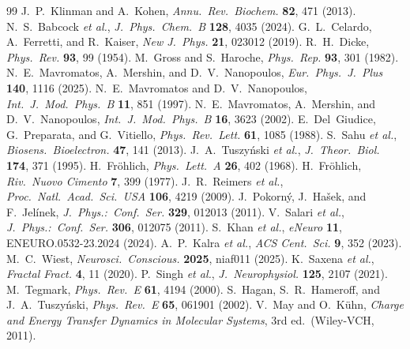 \documentclass[twocolumn,10pt]{article}
\begin{document}
\begin{thebibliography}{99}
 J.~P.~Klinman and A.~Kohen,
\textit{Annu.\ Rev.\ Biochem.} \textbf{82}, 471 (2013).
 N.~S.~Babcock \textit{et al.},
\textit{J.\ Phys.\ Chem.\ B} \textbf{128}, 4035 (2024).
 G.~L.~Celardo, A.~Ferretti, and R.~Kaiser,
\textit{New J.\ Phys.} \textbf{21}, 023012 (2019).
 R.~H.~Dicke,
\textit{Phys.\ Rev.} \textbf{93}, 99 (1954).
 M.~Gross and S.~Haroche,
\textit{Phys.\ Rep.} \textbf{93}, 301 (1982).
 N.~E.~Mavromatos, A.~Mershin, and D.~V.~Nanopoulos,
\textit{Eur.\ Phys.\ J.\ Plus} \textbf{140}, 1116 (2025).
 N.~E.~Mavromatos and D.~V.~Nanopoulos,
\textit{Int.\ J.\ Mod.\ Phys.\ B} \textbf{11}, 851 (1997).
 N.~E.~Mavromatos, A.~Mershin, and D.~V.~Nanopoulos,
\textit{Int.\ J.\ Mod.\ Phys.\ B} \textbf{16}, 3623 (2002).
 E.~Del~Giudice, G.~Preparata, and G.~Vitiello,
\textit{Phys.\ Rev.\ Lett.} \textbf{61}, 1085 (1988).
 S.~Sahu \textit{et al.},
\textit{Biosens.\ Bioelectron.} \textbf{47}, 141 (2013).
 J.~A.~Tuszy\'nski \textit{et al.},
\textit{J.\ Theor.\ Biol.} \textbf{174}, 371 (1995).
 H.~Fr\"ohlich,
\textit{Phys.\ Lett.\ A} \textbf{26}, 402 (1968).
 H.~Fr\"ohlich,
\textit{Riv.\ Nuovo Cimento} \textbf{7}, 399 (1977).
 J.~R.~Reimers \textit{et al.},
\textit{Proc.\ Natl.\ Acad.\ Sci.\ USA} \textbf{106}, 4219 (2009).
 J.~Pokorn\'y, J.~Ha\v{s}ek, and F.~Jel\'inek,
\textit{J.\ Phys.:\ Conf.\ Ser.} \textbf{329}, 012013 (2011).
 V.~Salari \textit{et al.},
\textit{J.\ Phys.:\ Conf.\ Ser.} \textbf{306}, 012075 (2011).
 S.~Khan \textit{et al.},
\textit{eNeuro} \textbf{11}, ENEURO.0532-23.2024 (2024).
 A.~P.~Kalra \textit{et al.},
\textit{ACS Cent.\ Sci.} \textbf{9}, 352 (2023).
 M.~C.~Wiest,
\textit{Neurosci.\ Conscious.} \textbf{2025}, niaf011 (2025).
 K.~Saxena \textit{et al.},
\textit{Fractal Fract.} \textbf{4}, 11 (2020).
 P.~Singh \textit{et al.},
\textit{J.\ Neurophysiol.} \textbf{125}, 2107 (2021).
 M.~Tegmark,
\textit{Phys.\ Rev.\ E} \textbf{61}, 4194 (2000).
 S.~Hagan, S.~R.~Hameroff, and J.~A.~Tuszy\'nski,
\textit{Phys.\ Rev.\ E} \textbf{65}, 061901 (2002).
 V.~May and O.~K\"uhn, \textit{Charge and Energy Transfer
Dynamics in Molecular Systems}, 3rd ed.\ (Wiley-VCH, 2011).

\end{thebibliography}
\end{document}
